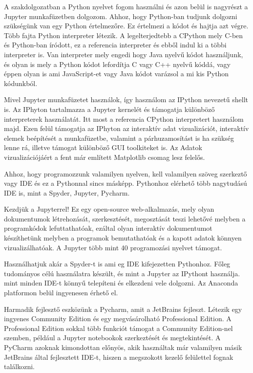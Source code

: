 
    A szakdolgozatban a Python nyelvet fogom használni és azon belül is
nagyrészt a Jupyter munkafüzetben dolgozom. Ahhoz, hogy Python-ban
tudjunk dolgozni szükségünk van egy Python értelmezőre. Ez értelmezi a
kódot és hajtja azt végre. Több fajta Python interpreter létezik. A
legelterjedtebb a CPython mely C-ben és Python-ban íródott, ez a
referencia interpreter és ebből indul ki a többi interpreter is. Van
interpreter mely engedi hogy Java nyelvű kódot használjunk, és olyan is
mely a Python kódot lefordítja C vagy C++ nyelvű kóddá, vagy éppen olyan
is ami JavaScript-et vagy Java kódot varázsol a mi kis Python kódunkból.

Mivel Jupyter munkafüzetet használok, így használom az IPython nevezetű
shellt is.
Az IPhyton tartalmazza a Jupyter kernelét és támogatja különböző
interpreterek használatát. Itt most a referencia CPython interpretert
használom majd. Ezen felül támogatja az IPhyton az interaktív adat
vizualizációt, interaktív elemek beépítését a munkafüzetbe, valamint a
párhuzamosítást is ha szükség lenne rá, illetve támogat különböző GUI
toolkiteket is. Az Adatok vizualizációjáért a fent már említett
Matplotlib csomag lesz felelős.

Ahhoz, hogy programozzunk valamilyen nyelven, kell valamilyen szöveg
szerkeztő vagy IDE és ez a Pythonnal sincs másképp. Pythonhoz elérhető
több nagytudású IDE is, mint a Spyder, Jupyter, Pycharm.

Kezdjük a Jupyterrel! Ez egy open-source web-alkalmazás, mely olyan
dokumentumok létrehozását, szerkesztését, megosztását teszi lehetővé
melyben a programkódok lefuttathatóak, ezáltal olyan interaktív
dokumentumot készíthetünk melyben a programok bemutathatóak és a kapott
adatok könnyen vizualizálhatóak. A Jupyter több mint 40 programozási
nyelvet támogat.

Használhatjuk akár a Spyder-t is ami eg IDE kifejezetten Pythonhoz.
Főleg tudományos célú használatra készült, és mint a Jupyter az IPythont
használja. mint minden IDE-t könnyű telepíteni és elkezdeni vele
dolgozni. Az Anaconda platformon belül ingyenesen érhető el.

Harmadik fejlesztő eszközünk a Pycharm, amit a JetBrains fejleszt.
Létezik egy ingyenes Community Edition és egy megvásárolható
Professional Edition. A Professional Edition sokkal több funkciót
támogat a Community Edition-nel szemben, például a Jupyter notebookok
szerkeztését és megtekintését. A PyCharm azoknak kimondottan előnyös,
akik használtak már valamilyen másik JetBrains által fejlesztett IDE-t,
hiszen a megszokott kezelő felülettel fognak találkozni.
